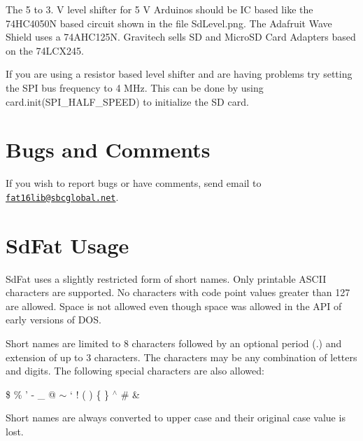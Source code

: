 The 5 to 3. V level shifter for 5 V Arduinos should be I\-C based like the 74\-H\-C4050\-N based circuit shown in the file Sd\-Level.\-png. The Adafruit Wave Shield uses a 74\-A\-H\-C125\-N. Gravitech sells S\-D and Micro\-S\-D Card Adapters based on the 74\-L\-C\-X245.

If you are using a resistor based level shifter and are having problems try setting the S\-P\-I bus frequency to 4 M\-Hz. This can be done by using card.\-init(\-S\-P\-I\-\_\-\-H\-A\-L\-F\-\_\-\-S\-P\-E\-E\-D) to initialize the S\-D card.\hypertarget{index_comment}{}\section{Bugs and Comments}\label{index_comment}
If you wish to report bugs or have comments, send email to \href{mailto:fat16lib@sbcglobal.net}{\tt fat16lib@sbcglobal.\-net}.\hypertarget{index_SdFatClass}{}\section{Sd\-Fat Usage}\label{index_SdFatClass}
Sd\-Fat uses a slightly restricted form of short names. Only printable A\-S\-C\-I\-I characters are supported. No characters with code point values greater than 127 are allowed. Space is not allowed even though space was allowed in the A\-P\-I of early versions of D\-O\-S.

Short names are limited to 8 characters followed by an optional period (.) and extension of up to 3 characters. The characters may be any combination of letters and digits. The following special characters are also allowed\-:

\$ \% ' -\/ \-\_\- @ $\sim$ ` ! ( ) \{ \} $^\wedge$ \# \&

Short names are always converted to upper case and their original case value is lost.

